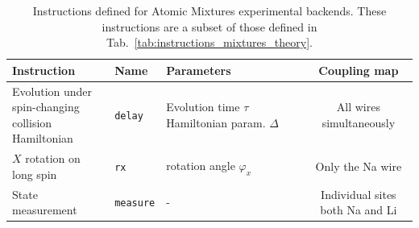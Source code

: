 \documentclass[a4paper, 10pt]{article}
\begin{document}
    \begin{table}[htbp]
        \centering
        \caption{Instructions defined for Atomic Mixtures experimental backends. These instructions are a subset of those defined in Tab.~\ref{tab:instructions_mixtures_theory}.
        \label{tab:instructions_mixtures_experiment}}
        \begin{tabular}{l l l c}
            Instruction & Name & Parameters & Coupling map \\ \hline\hline
            \makecell[l]{Evolution under \\ spin-changing collision \\ Hamiltonian} & \texttt{delay} & \makecell[l]{Evolution time $\tau$ \\ Hamiltonian param. $\Delta$} & All wires simultaneously \\  \hline
            \makecell[l]{$X$ rotation \\ on long spin} & \texttt{rx} & rotation angle $\varphi_x$ & Only the Na wire \\ \hline

            State measurement & \texttt{measure} & - & \makecell{Individual sites \\ both Na and Li} \\ \hline

        \end{tabular}
    \end{table}
    
\end{document}
